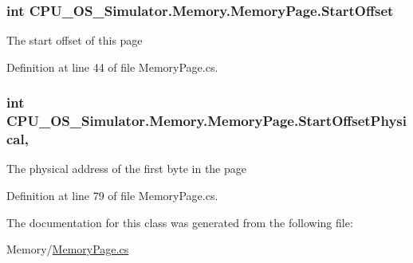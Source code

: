 \subsubsection[{Start\+Offset}]{\setlength{\rightskip}{0pt plus 5cm}int C\+P\+U\+\_\+\+O\+S\+\_\+\+Simulator.\+Memory.\+Memory\+Page.\+Start\+Offset\hspace{0.3cm}{\ttfamily [get]}}\label{class_c_p_u___o_s___simulator_1_1_memory_1_1_memory_page_ad700979e51dd3d05470c681588c6fa79}


The start offset of this page 



Definition at line 44 of file Memory\+Page.\+cs.

\hypertarget{class_c_p_u___o_s___simulator_1_1_memory_1_1_memory_page_af31a2243a3e68ec635315929859fa358}{}
\subsubsection[{Start\+Offset\+Physical}]{\setlength{\rightskip}{0pt plus 5cm}int C\+P\+U\+\_\+\+O\+S\+\_\+\+Simulator.\+Memory.\+Memory\+Page.\+Start\+Offset\+Physical\hspace{0.3cm}{\ttfamily [get]}, {\ttfamily [set]}}\label{class_c_p_u___o_s___simulator_1_1_memory_1_1_memory_page_af31a2243a3e68ec635315929859fa358}


The physical address of the first byte in the page 



Definition at line 79 of file Memory\+Page.\+cs.



The documentation for this class was generated from the following file\+:\begin{DoxyCompactItemize}
\item 
Memory/\hyperlink{_memory_page_8cs}{Memory\+Page.\+cs}\end{DoxyCompactItemize}
